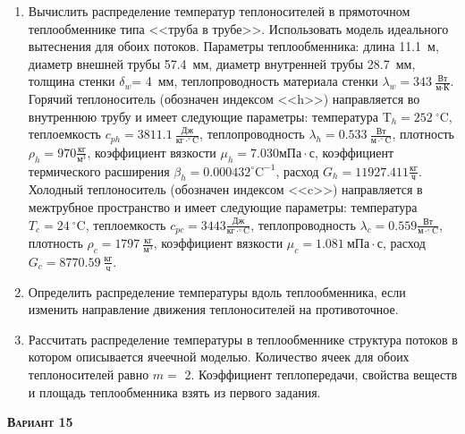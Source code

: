 \begin{enumerate} 
\item Вычислить распределение температур теплоносителей в прямоточном теплообменнике типа <<труба в трубе>>. Использовать модель идеального вытеснения для обоих потоков. Параметры теплообменника: длина  11.1~м, диаметр внешней трубы 57.4~мм,  диаметр внутренней трубы 28.7~мм, толщина стенки $\delta_{w}$=     4~мм,  теплопроводность материала стенки $\lambda_{w}=  343~\frac{\text{Вт}}{\text{м} \cdot \text{К}}$.  Горячий теплоноситель (обозначен индексом <<h>>) направляется во внутреннюю трубу и	 имеет следующие параметры: температура $\text{T}_{h}= 252~^\circ\mathrm{C}$, теплоемкость	  $c_{p{h}}= 3811.1~\frac{\text{Дж}}{\text{кг} \cdot ^\circ\mathrm{C}}$, теплопроводность 		$\lambda_{h}= 0.533~\frac{\text{Вт}}{\text{м} \cdot ^\circ\mathrm{C}}$, плотность 		$\rho_{h}=  970 \frac{\text{кг}}{\text{м}^3}$, коэффициент вязкости $\mu_{h}=7.030 \text{мПа} 		\cdot \text{с} $, коэффициент термического расширения $\beta_{h}=0.000432 ^\circ\mathrm{C}^{-1}$,		 расход $G_{h}= 11927.411 \frac{\text{кг}}{\text{ч}}$. Холодный теплоноситель (обозначен индексом <<c>>) 		 направляется в межтрубное пространство и имеет следующие параметры: температура $T_{c}=   24		 ~^\circ\mathrm{C}$, теплоемкость $c_{p{c}}= 3443 \frac{\text{Дж}}{\text{кг} \cdot ^\circ\mathrm{C}}$,			 теплопроводность $\lambda_{c}=0.559 \frac{\text{Вт}}{\text{м} \cdot ^\circ\mathrm{C}}$, плотность 			 $\rho_{c}=  1797~\frac{\text{кг}}{\text{м}^3}$, коэффициент вязкости $\mu_{c}=1.081~\text{мПа} \cdot \text{с} $, 			 расход $G_{c}=8770.59~\frac{\text{кг}}{\text{ч}}$. 

\item Определить распределение температуры вдоль теплообменника, если 	изменить направление движения теплоносителей на противоточное.

\item Рассчитать распределение температуры в теплообменнике структура потоков в котором описывается ячеечной моделью. Количество ячеек для обоих теплоносителей равно $m = $ 2. Коэффициент теплопередачи, свойства веществ и площадь теплообменника взять из первого задания.

\end{enumerate}

\textsc{\textbf{Вариант 15}}

